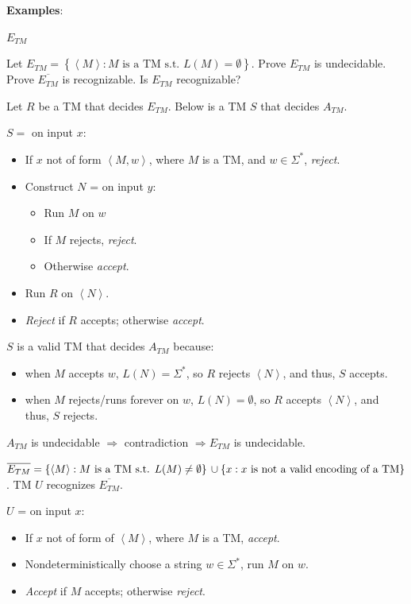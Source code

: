 \documentclass[10pt,landscape,a4paper]{article}
\newcommand{\set}[1]{\left \{ #1 \right \}}
\newcommand{\encoding}[1]{\left \langle #1 \right \rangle}
\begin{document}
\begin{multicols*}{3}
\textbf{Examples}:

\underline{$E_{TM}$}

Let $E_{TM} = \set{\encoding{M}: M \text{ is a TM s.t. } L(M) = \emptyset}$. Prove $E_{TM}$ is undecidable. Prove $\overline{E_{TM}}$ is recognizable. Is $E_{TM}$ recognizable?

Let $R$ be a TM that decides $E_{TM}$. Below is a TM $S$ that decides $A_{TM}$.

$S = $ on input $x$:

\begin{itemize}
    \item If $x$ not of form $\encoding{M, w}$, where $M$ is a TM, and $w \in \Sigma^*$, \emph{reject}.
    \item Construct $N$ = on input $y$:
    \begin{itemize}
        \item Run $M$ on $w$
        \item If $M$ rejects, \emph{reject}.
        \item Otherwise \emph{accept}.
    \end{itemize}
    \item Run $R$ on $\encoding{N}$.
    \item \emph{Reject} if $R$ accepts; otherwise \emph{accept}.
\end{itemize}

$S$ is a valid TM that decides $A_{TM}$ because:

\begin{itemize}
    \item when $M$ accepts $w$, $L(N) = \Sigma^*$, so $R$ rejects $\encoding{N}$, and thus, $S$ accepts.
    \item when $M$ rejects/runs forever on $w$, $L(N) = \emptyset$, so $R$ accepts $\encoding{N}$, and thus, $S$ rejects.
\end{itemize}

$A_{TM}$ is undecidable $\Rightarrow$ contradiction $\Rightarrow E_{TM}$ is undecidable.

$\overline{E_{TM}}= \set{\encoding{M}: M \text{ is a TM s.t. } L(M) \neq \emptyset} \\ \cup \set{x: x \text{ is not a valid encoding of a TM}}$. TM $U$ recognizes $\overline{E_{TM}}$.

$U$ = on input $x$:

\begin{itemize}
    \item If $x$ not of form of $\encoding{M}$, where $M$ is a TM, \emph{accept}.
    \item Nondeterministically choose a string $w \in \Sigma^*$, run $M$ on $w$.
    \item \emph{Accept} if $M$ accepts; otherwise \emph{reject}.
\end{itemize}


\end{multicols*}
\end{document}
